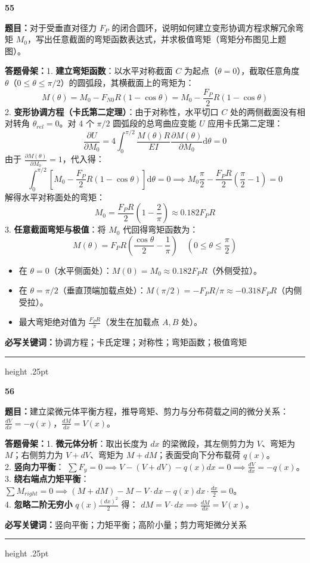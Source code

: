 \documentclass[a4paper,10pt]{article}
\newcommand{\qitem}[5]{%
\Needspace{6\baselineskip}
\vspace{3pt}
{\Large\bfseries\color{deep} #1}\quad{\bfseries\color{orangea}#2}\par
\textbf{题目：}#3\par
\textbf{答题骨架：}#4\par
\textbf{必写关键词：}{\color{bluea}#5}\par
\vspace{2pt}\hrule height .25pt
}
\begin{document}
\qitem{55}{超静定圆环求解}
{对于受垂直对径力 \(F_P\) 的闭合圆环，说明如何建立变形协调方程求解冗余弯矩 \(M_0\)，写出任意截面的弯矩函数表达式，并求极值弯矩（弯矩分布图见上题图）。}
{1. \textbf{建立弯矩函数}：以水平对称截面 \(C\) 为起点（\(\theta=0\)），截取任意角度 \(\theta\)（\(0 \le \theta \le \pi/2\)）的圆弧段，其横截面上的弯矩为：
   \[ M(\theta) = M_0 - F_{N0} R (1 - \cos\theta) = M_0 - \frac{F_P}{2} R (1 - \cos\theta) \]
2. \textbf{变形协调方程（卡氏第二定理）}：由于对称性，水平切口 \(C\) 处的两侧截面没有相对转角 \(\theta_{rel} = 0\)。对 4 个 \(\pi/2\) 圆弧段的总弯曲应变能 \(U\) 应用卡氏第二定理：
   \[ \frac{\partial U}{\partial M_0} = 4 \int_0^{\pi/2} \frac{M(\theta) R}{EI} \frac{\partial M(\theta)}{\partial M_0} \mathrm{d}\theta = 0 \]
   由于 \(\frac{\partial M(\theta)}{\partial M_0} = 1\)，代入得：
   \[ \int_0^{\pi/2} \left[ M_0 - \frac{F_P}{2} R (1 - \cos\theta) \right] \mathrm{d}\theta = 0 \implies M_0 \frac{\pi}{2} - \frac{F_P R}{2}\left(\frac{\pi}{2} - 1\right) = 0 \]
   解得水平对称面处的弯矩：
   \[ M_0 = \frac{F_P R}{2} \left( 1 - \frac{2}{\pi} \right) \approx 0.182 F_P R \]
3. \textbf{任意截面弯矩与极值}：将 \(M_0\) 代回得弯矩函数为：
   \[ M(\theta) = F_P R \left( \frac{\cos\theta}{2} - \frac{1}{\pi} \right) \quad \left(0 \le \theta \le \frac{\pi}{2}\right) \]
   \begin{itemize}
     \item 在 \(\theta = 0\)（水平侧面处）：\(M(0) = M_0 \approx 0.182 F_P R\)（外侧受拉）。
     \item 在 \(\theta = \pi/2\)（垂直顶端加载点处）：\(M(\pi/2) = -F_P R/\pi \approx -0.318 F_P R\)（内侧受拉）。
     \item 最大弯矩绝对值为 \(\frac{F_P R}{\pi}\)（发生在加载点 \(A, B\) 处）。
   \end{itemize}}
{协调方程；卡氏定理；对称性；弯矩函数；极值弯矩}


\qitem{56}{梁微元平衡}
{建立梁微元体平衡方程，推导弯矩、剪力与分布荷载之间的微分关系：\(\frac{dV}{dx}=-q(x)\)，\(\frac{dM}{dx}=V(x)\)。}
{1. \textbf{微元体分析}：取出长度为 \(dx\) 的梁微段，其左侧剪力为 \(V\)、弯矩为 \(M\)；右侧剪力为 \(V+dV\)、弯矩为 \(M+dM\)；表面受向下分布载荷 \(q(x)\)。\\
2. \textbf{竖向力平衡}：
   \(\sum F_y = 0 \implies V - (V+dV) - q(x)dx = 0 \implies \frac{dV}{dx} = -q(x)\)。\\
3. \textbf{绕右端点力矩平衡}：
   \(\sum M_{right} = 0 \implies (M+dM) - M - V \cdot dx - q(x)dx \cdot \frac{dx}{2} = 0\)。\\
4. \textbf{忽略二阶无穷小} \(q(x)\frac{(dx)^2}{2}\) 得：
   \(dM = V \cdot dx \implies \frac{dM}{dx} = V(x)\)。}
{竖向平衡；力矩平衡；高阶小量；剪力弯矩微分关系}
\end{document}
